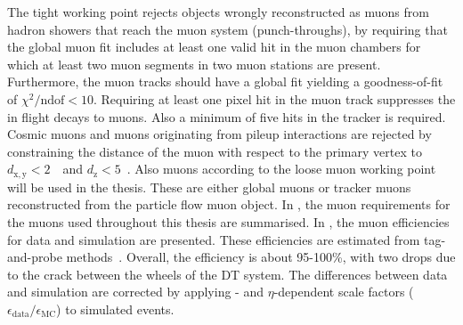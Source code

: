 The tight working point rejects objects wrongly reconstructed as muons from hadron showers that reach the muon system (punch-throughs), by requiring that the global muon fit includes at least one valid hit in the muon chambers for which at least two muon segments in two muon stations are present. Furthermore, the muon tracks should have a global fit yielding a goodness-of-fit of $\chi^2 / \mathrm{ndof} < 10$. Requiring at least one pixel hit in the muon track suppresses the in flight decays to muons. Also a minimum of five hits in the tracker is required. Cosmic muons and muons originating from pileup interactions are rejected by constraining the distance of the muon with respect to the primary vertex to $d_{\mathrm{x,y}}< 2$~\mm\ and $d_{\mathrm{z}}<5$~\mm. Also muons according to the loose muon working point will be used in the thesis. These are either global muons or tracker muons reconstructed from the particle flow muon object. In , the muon requirements for the muons used throughout this thesis are summarised.  In , the muon efficiencies for data and simulation are presented. These efficiencies are estimated from tag-and-probe methods~\cite{CMS-DP-2017-007}.
Overall, the efficiency is about 95-100\%, with two drops due to the crack between the wheels of the DT system. The differences between data and simulation are corrected by applying \pt- and $\eta$-dependent scale factors ($\epsilon_{\mathrm{data}}/\epsilon_{\mathrm{MC}}$) to simulated events. 
